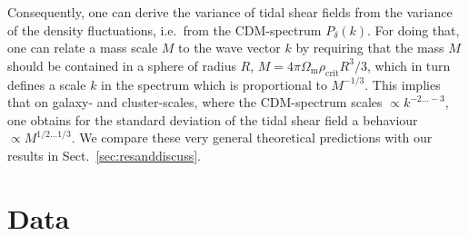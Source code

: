\documentclass[a4paper,fleqn,usenatbib]{mnras}
\begin{document}
Consequently, one can derive the variance of tidal shear fields from the variance of the density fluctuations, i.e.\ from the CDM-spectrum $P_\delta(k)$. For doing that, one can relate a mass scale $M$ to the wave vector $k$ by requiring that the mass $M$ should be contained in a sphere of radius $R$, $M=4\pi\Omega_\mathrm{m}\rho_\mathrm{crit}R^3/3$, which in turn defines a scale $k$ in the spectrum which is proportional to $M^{-1/3}$. This implies that on galaxy- and cluster-scales, where the CDM-spectrum scales $\propto k^{-2\ldots-3}$, one obtains for the standard deviation of the tidal shear field a behaviour $\propto M^{1/2\ldots 1/3}$. We compare these very general theoretical predictions with our results in Sect.~\ref{sec:resanddiscuss}.
\section{Data}
\label{sec:data}
\end{document}
